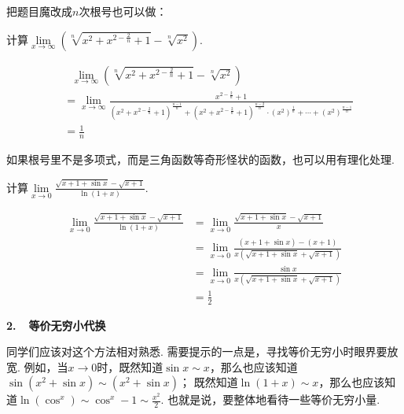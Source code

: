 把题目魔改成$n$次根号也可以做：

\begin{example}
\label{ex:ch01-09}
计算$\lim\limits_{x \to \infty}(\sqrt[n]{x^{2}+x^{2-\frac{2}{n}}+1}-\sqrt[n]{x^{2}})$.
\end{example}

\begin{solution}
\begin{equation}
    \begin{aligned}
        &~~~\lim\limits_{x \to \infty}(\sqrt[n]{x^{2}+x^{2-\frac{2}{n}}+1}-\sqrt[n]{x^{2}}) \\
        &= \lim\limits_{x \to \infty}\frac{x^{2-\frac{2}{n}}+1}{(x^2+x^{2-\frac{2}{n}}+1)^{\frac{n-1}{n}}+
        (x^2+x^{2-\frac{2}{n}}+1)^{\frac{n-2}{n}}\cdot (x^{2})^{\frac{1}{n}}
        +\cdots +(x^{2})^{\frac{n-1}{n}}} \\
        &= \frac{1}{n}
        \nonumber
    \end{aligned}
\end{equation}
\end{solution}

如果根号里不是多项式，而是三角函数等奇形怪状的函数，也可以用有理化处理.

\begin{example}
\label{ex:ch01-10}
计算$\lim\limits_{x \to 0}\displaystyle\frac{\sqrt{x+1+\sin x}-\sqrt{x+1}}{\ln(1+x)}$.
\end{example}

\begin{solution}
\begin{equation}
    \begin{aligned}
        \lim\limits_{x \to 0}\displaystyle\frac{\sqrt{x+1+\sin x}-\sqrt{x+1}}{\ln(1+x)}
        &= \lim\limits_{x \to 0}\displaystyle\frac{\sqrt{x+1+\sin x}-\sqrt{x+1}}{x} \\
        &= \lim\limits_{x \to 0}\displaystyle\frac{(x+1+\sin x)-(x+1)}{x(\sqrt{x+1+\sin x}+\sqrt{x+1})} \\
        &= \lim\limits_{x \to 0}\displaystyle\frac{\sin x}{x(\sqrt{x+1+\sin x}+\sqrt{x+1})} \\
        &= \frac{1}{2}
        \nonumber
    \end{aligned}
\end{equation}
\end{solution}

\textbf{2.~~等价无穷小代换} \vspace{0.5em}

同学们应该对这个方法相对熟悉. 需要提示的一点是，寻找等价无穷小时眼界要放宽.
例如，当$x \to 0$时，既然知道$\sin x \sim x$，那么也应该知道$\sin(x^2+\sin x) \sim (x^2+\sin x)$；
既然知道$\ln (1+x) \sim x$，那么也应该知道$\ln(\cos^{x}) \sim \cos^{x}-1 \sim \displaystyle\frac{x^{2}}{2}$. 也就是说，要整体地看待一些等价无穷小量.

